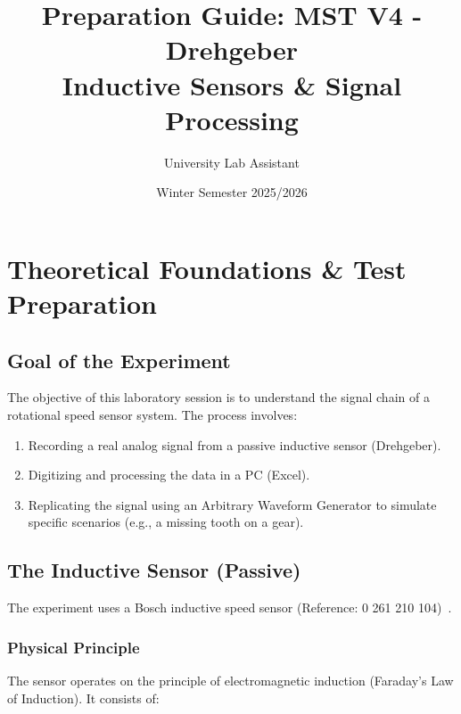 \documentclass[a4paper,12pt]{article}
\title{\textbf{Preparation Guide: MST V4 - Drehgeber}\\Inductive Sensors \& Signal Processing}
\author{University Lab Assistant}
\date{Winter Semester 2025/2026}
\begin{document}
\maketitle

\tableofcontents

\newpage



\section{Theoretical Foundations \& Test Preparation}



\subsection{Goal of the Experiment}

The objective of this laboratory session is to understand the signal chain of a rotational speed sensor system. The process involves:

\begin{enumerate}

    \item Recording a real analog signal from a passive inductive sensor (Drehgeber).

    \item Digitizing and processing the data in a PC (Excel).

    \item Replicating the signal using an Arbitrary Waveform Generator to simulate specific scenarios (e.g., a missing tooth on a gear).

\end{enumerate}



\subsection{The Inductive Sensor (Passive)}

The experiment uses a Bosch inductive speed sensor (Reference: 0 261 210 104)~\cite{ref25,ref26}.



\subsubsection{Physical Principle}

The sensor operates on the principle of electromagnetic induction (Faraday's Law of Induction). It consists of:
\end{document}
